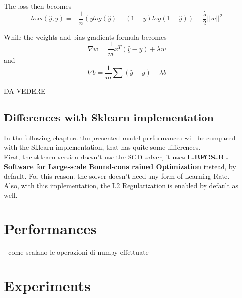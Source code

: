 \documentclass[
	letterpaper, %
	10pt, %
]{class}
\begin{document}
The loss then becomes
$$ loss(\hat{y}, y) = -\frac{1}{n}(y log(\hat{y}) + (1-y)log(1-\hat{y})) + \frac{\lambda}{2}||w||^2 $$

While the weights and bias gradients formula becomes
$$ \nabla w = \frac{1}{m}x^T(\hat{y} - y) + \lambda w $$
and
$$ \nabla b = \frac{1}{m}\sum(\hat{y} - y) + \lambda b$$

DA VEDERE

\subsection{Differences with Sklearn implementation}

In the following chapters the presented model performances will be compared with the Sklearn implementation, that has quite some differences.\\
First, the sklearn version doesn't use the SGD solver, it uses \textbf{L-BFGS-B - Software for Large-scale Bound-constrained Optimization} instead, by default.
For this reason, the solver doesn't need any form of Learning Rate.\\
Also, with this implementation, the L2 Regularization is enabled by default as well.



\section{Performances}

- come scalano le operazioni di numpy effettuate


\section{Experiments}
\end{document}
